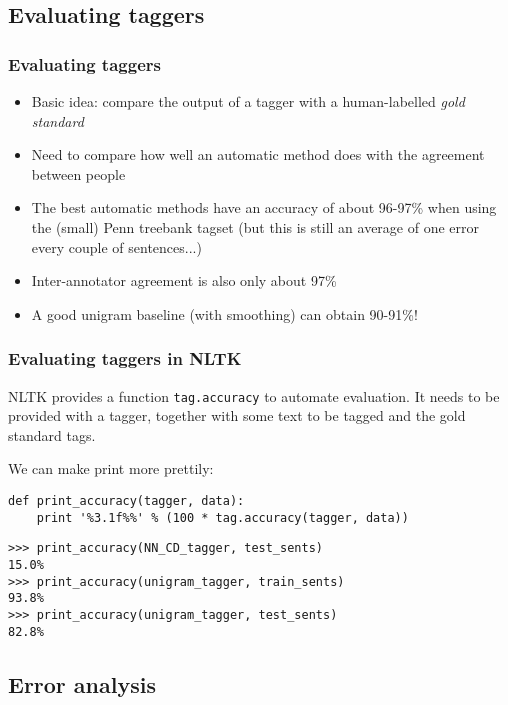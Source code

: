 \documentclass{beamer}
\begin{document}
\subsection{Evaluating taggers}

\begin{frame}
  \frametitle{Evaluating taggers}
  \begin{itemize}
  \item Basic idea: compare the output of a tagger with a
    human-labelled \emph{gold standard}
  \item Need to compare how well an automatic method does with the
    agreement between people
  \item The best automatic methods have an accuracy of about 96-97\%
    when using the (small) Penn treebank tagset (but this is still an
    average of one error every couple of sentences...)
  \item Inter-annotator agreement is also only about 97\% 
  \item A good unigram baseline (with smoothing) can obtain 90-91\%!
  \end{itemize}
\end{frame}

\begin{frame}[fragile]
  \frametitle{Evaluating taggers in NLTK}
  NLTK provides a function \texttt{tag.accuracy} to automate
  evaluation.  It needs to be provided with a tagger, together with
  some text to be tagged and the gold standard tags.  
  
  \pause
  We can make
  print more prettily:
\begin{verbatim}
def print_accuracy(tagger, data):
    print '%3.1f%%' % (100 * tag.accuracy(tagger, data))
\end{verbatim}

  \pause
\begin{verbatim}
>>> print_accuracy(NN_CD_tagger, test_sents)
15.0%
>>> print_accuracy(unigram_tagger, train_sents)
93.8%
>>> print_accuracy(unigram_tagger, test_sents)
82.8%
\end{verbatim}
\end{frame}

\subsection{Error analysis} 
\end{document}
